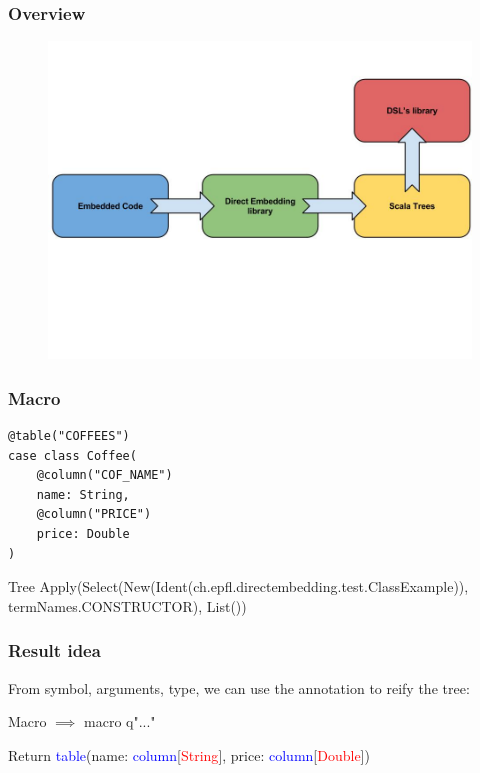 \documentclass{beamer}
\newcommand{\TCR}{\textcolor{red}}
\newcommand{\TCB}{\textcolor{blue}}
\begin{document}
\begin{frame}
\frametitle{Overview}
\begin{figure}
\includegraphics[width=0.8\linewidth]{./img/flow.jpg}
\end{figure}
\end{frame}


\begin{frame}[fragile]
\frametitle{Macro}

\begin{lstlisting}
@table("COFFEES")
case class Coffee(
    @column("COF_NAME")
    name: String,
    @column("PRICE")
    price: Double
)
\end{lstlisting}

\begin{block}{Tree}
 Apply(Select(New(Ident(ch.epfl.directembedding.test.ClassExample)), termNames.CONSTRUCTOR), List())
\end{block}

\end{frame}


\begin{frame}[fragile]
\frametitle{Result idea}

From symbol, arguments, type, we can use the annotation to reify the tree:
\begin{block}{Macro}
 $\implies$ macro q"..." 
\end{block}

\begin{block}{Return}
 \TCB{table}(name: \TCB{column}[\TCR{String}], price: \TCB{column}[\TCR{Double}])
\end{block}

\end{frame}
\end{document}
